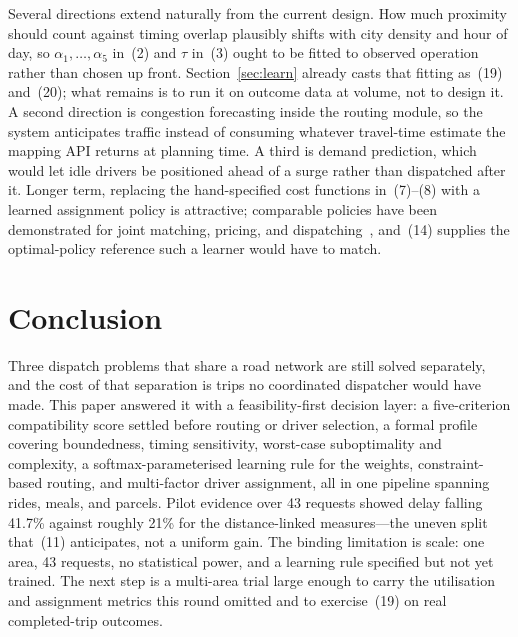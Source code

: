 \documentclass[conference]{IEEEtran}
\begin{document}
Several directions extend naturally from the current design. How much proximity should count against timing overlap plausibly shifts with
city density and hour of day, so $\alpha_1,\dots,\alpha_5$ in~(2) and $\tau$
in~(3) ought to be fitted to observed operation rather than chosen up front.
Section~\ref{sec:learn} already casts that fitting as~(19) and~(20); what
remains is to run it on outcome data at volume, not to design it. A second
direction is congestion forecasting inside the routing module, so the system
anticipates traffic instead of consuming whatever travel-time estimate the
mapping API returns at planning time. A third is demand prediction, which
would let idle drivers be positioned ahead of a surge rather than dispatched
after it. Longer term, replacing the hand-specified cost functions
in~(7)--(8) with a learned assignment policy is attractive; comparable
policies have been demonstrated for joint matching, pricing, and
dispatching~\cite{haliem2021,manchella2022}, and~(14) supplies the
optimal-policy reference such a learner would have to match.

\section{Conclusion}
Three dispatch problems that share a road network are still solved
separately, and the cost of that separation is trips no coordinated dispatcher
would have made. This paper answered it with a feasibility-first decision
layer: a five-criterion compatibility score settled before routing or driver
selection, a formal profile covering boundedness, timing sensitivity,
worst-case suboptimality and complexity, a softmax-parameterised learning rule
for the weights, constraint-based routing, and multi-factor driver assignment,
all in one pipeline spanning rides, meals, and parcels. Pilot evidence over 43
requests showed delay falling 41.7\% against roughly 21\% for the
distance-linked measures---the uneven split that~(11) anticipates, not a
uniform gain. The binding limitation is scale: one area, 43 requests, no
statistical power, and a learning rule specified but not yet trained. The next
step is a multi-area trial large enough to carry the utilisation and
assignment metrics this round omitted and to exercise~(19) on real
completed-trip outcomes.
\end{document}
